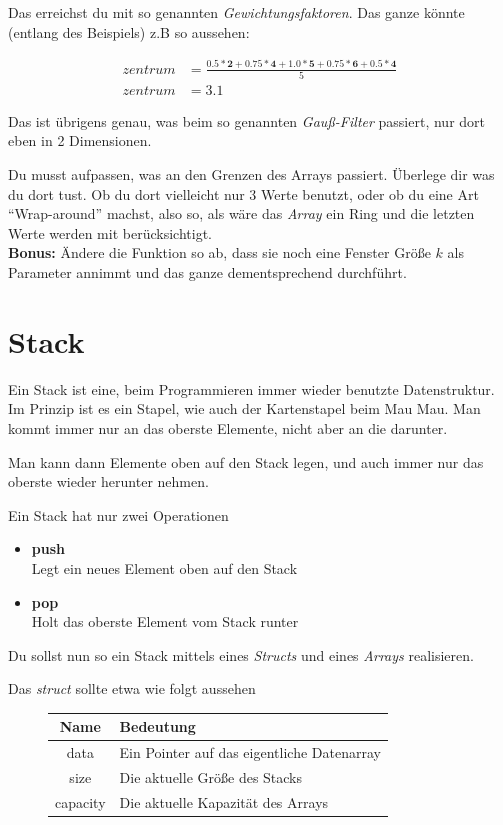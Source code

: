 \documentclass[c_worksheet.tex]{subfiles}
\begin{document}
Das erreichst du mit so genannten \emph{Gewichtungsfaktoren}. Das ganze könnte (entlang des Beispiels) z.B so aussehen:

\begin{align*}
	zentrum &= \frac{0.5 * \textbf{2} + 0.75 * \textbf{4} + 1.0 * \textbf{5} + 0.75 * \textbf{6} + 0.5 * \textbf{4}}{5} \\
	zentrum &= 3.1
\end{align*}

Das ist übrigens genau, was beim so genannten \emph{Gauß-Filter} passiert, nur dort eben in 2 Dimensionen.

Du musst aufpassen, was an den Grenzen des Arrays passiert. Überlege dir was du dort tust. Ob du dort vielleicht nur 3 Werte benutzt, oder ob du eine Art ``Wrap-around'' machst, also so, als wäre das \emph{Array} ein Ring und die letzten Werte werden mit berücksichtigt. \\

\textbf{Bonus:} Ändere die Funktion so ab, dass sie noch eine Fenster Größe \(k\) als Parameter annimmt und das ganze dementsprechend durchführt.



\section{Stack}

Ein Stack ist eine, beim Programmieren immer wieder benutzte Datenstruktur. Im Prinzip ist es ein Stapel, wie auch der Kartenstapel beim Mau Mau. Man kommt immer nur an das oberste Elemente, nicht aber an die darunter.

Man kann dann Elemente oben auf den Stack legen, und auch immer nur das oberste wieder herunter nehmen.

Ein Stack hat nur zwei Operationen

\begin{itemize}
	\item \textbf{push} \\
	Legt ein neues Element oben auf den Stack
	\item \textbf{pop} \\
	Holt das oberste Element vom Stack runter
\end{itemize}

Du sollst nun so ein Stack mittels eines \emph{Structs} und eines \emph{Arrays} realisieren. 

Das \emph{struct} sollte etwa wie folgt aussehen

\begin{figure}[h]
\center
\begin{tabular}{ c | l }
\textbf{Name} & \textbf{Bedeutung} \\
\hline
data      & Ein Pointer auf das eigentliche Datenarray \\
size      & Die aktuelle Größe des Stacks \\
capacity  & Die aktuelle Kapazität des Arrays \\
\end{tabular}
\end{figure}
\end{document}
